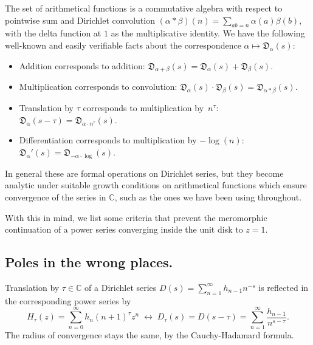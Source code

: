\documentclass[11pt,a4paper]{amsart}
\newcommand{\N}{\mathbb{N}}
\newcommand{\C}{\mathbb{C}}
\newcommand{\D}{\mathfrak{D}}
\theoremstyle{plain}
\theoremstyle{plain}
\theoremstyle{plain}
\theoremstyle{definition}
\theoremstyle{remark}
\begin{document}
The set of arithmetical functions is a commutative algebra with respect to pointwise sum and Dirichlet convolution
\(
  (\alpha * \beta)(n) = \sum_{ab=n} \alpha(a) \beta(b),
\)
with the delta function at $1$ as the multiplicative identity. 
We have the following well-known and easily verifiable facts about the correspondence $\alpha \mapsto \D_{\alpha}(s)$:
\begin{itemize}
\item Addition corresponds to addition: $\D_{\alpha+\beta}(s) = \D_{\alpha}(s) +  \D_{\beta}(s)$. 

\item Multiplication corresponds to convolution: $\D_{\alpha}(s) \cdot \D_{\beta}(s) = \D_{\alpha * \beta}(s)$. 

\item Translation by $\tau$ corresponds to multiplication by~$n^{\tau}$: $\D_{\alpha}(s-\tau) = \D_{\alpha \cdot n^{\tau}}(s)$.

\item Differentiation corresponds to multiplication by $-\log(n)$: $\D_{\alpha}'(s) = \D_{-\alpha \cdot \log}(s)$.
\end{itemize}
In general these are formal operations on Dirichlet series, but they become analytic under suitable growth conditions on arithmetical functions which ensure convergence of the series in $\C$, such as the ones we have been using throughout.


With this in mind, we list some criteria that prevent the meromorphic continuation of a power series converging inside the unit disk to $z=1$.


\subsection{Poles in the wrong places.}
\label{subsec:poles_wrong}

Translation by $\tau \in \C$ of a Dirichlet series $D(s) = \sum_{n=1}^{\infty} h_{n-1} n^{-s}$ is reflected in the corresponding power series by
\[
  H_{\tau}(z) = \sum_{n=0}^{\infty} h_{n} (n+1)^{\tau} z^{n}
  \;\longleftrightarrow\; D_{\tau}(s) = D(s - \tau)
  = \sum_{n=1}^{\infty} \frac{h_{n-1}}{n^{s-\tau}}.
\]
The radius of convergence stays the same, by the Cauchy-Hadamard formula.

\end{document}
